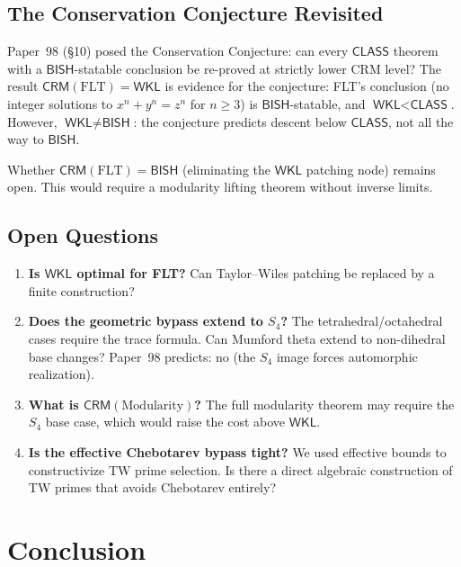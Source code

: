 \documentclass[11pt,a4paper]{article}
\theoremstyle{plain}
\theoremstyle{definition}
\newcommand{\BISH}{\textsf{BISH}}
\newcommand{\WKL}{\textsf{WKL}}
\newcommand{\CLASS}{\textsf{CLASS}}
\newcommand{\CRM}{\textsf{CRM}}
\begin{document}
\subsection{The Conservation Conjecture Revisited}

Paper~98 (\S10) posed the Conservation Conjecture: can every $\CLASS$ theorem with a $\BISH$-statable conclusion be re-proved at strictly lower CRM level?
The result $\CRM(\mathrm{FLT}) = \WKL$ is evidence for the conjecture: FLT's conclusion (no integer solutions to $x^n + y^n = z^n$ for $n \geq 3$) is $\BISH$-statable, and $\WKL < \CLASS$.
However, $\WKL \neq \BISH$: the conjecture predicts descent below $\CLASS$, not all the way to $\BISH$.

Whether $\CRM(\mathrm{FLT}) = \BISH$ (eliminating the $\WKL$ patching node) remains open.
This would require a modularity lifting theorem without inverse limits.

\subsection{Open Questions}

\begin{enumerate}[label=(\arabic*)]
\item \textbf{Is $\WKL$ optimal for FLT?} Can Taylor--Wiles patching be replaced by a finite construction?

\item \textbf{Does the geometric bypass extend to $S_4$?} The tetrahedral/octahedral cases require the trace formula. Can Mumford theta extend to non-dihedral base changes? Paper~98 predicts: no (the $S_4$ image forces automorphic realization).

\item \textbf{What is $\CRM(\mathrm{Modularity})$?} The full modularity theorem may require the $S_4$ base case, which would raise the cost above $\WKL$.

\item \textbf{Is the effective Chebotarev bypass tight?} We used effective bounds to constructivize TW prime selection. Is there a direct algebraic construction of TW primes that avoids Chebotarev entirely?
\end{enumerate}


\section{Conclusion}\label{sec:conclusion}
\end{document}
